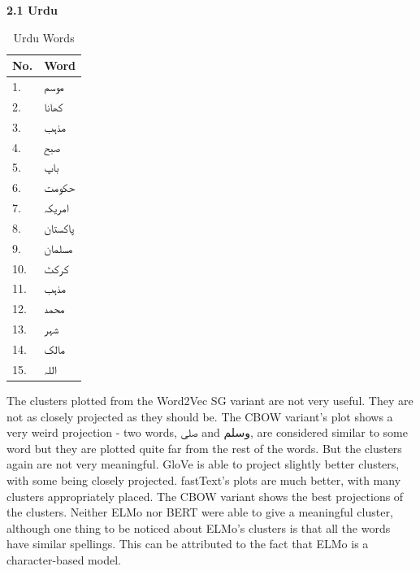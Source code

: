 \documentclass[format=acmsmall,review=true,screen=true]{acmart}
\begin{document}
\textbf{2.1 Urdu}\\

        \begin{table}[]
    \begin{tabular}{|l|l|}
        \hline
                            \textbf{No.} & \textbf{Word}    \\
    \hline
    1.            &      \texturdu{موسم}\\
       \hline
    \hline
    2.           &      \texturdu{کھانا}\\
       \hline
    \hline
    3.             &      \texturdu{مذہب}\\
       \hline
    \hline
    4.             &      \texturdu{صبح}\\
       \hline
        \hline
    5.             &      \texturdu{باپ}\\
       \hline
    \hline
    6.             &      \texturdu{حکومت}\\
       \hline
    \hline
    7.             &      \texturdu{امریکہ}\\
       \hline
    \hline
    8.             &      \texturdu{پاکستان}\\
       \hline
    \hline
    9.             &      \texturdu{مسلمان}\\
       \hline
    \hline
    10.             &      \texturdu{کرکٹ}\\
       \hline
    \hline
    11.             &      \texturdu{مذہب}\\
       \hline
    \hline
    12.             &      \texturdu{محمد}\\
       \hline      
    \hline
    13.             &      \texturdu{شہر}\\
       \hline     
    \hline
    14.             &      \texturdu{مالک}\\
       \hline     
    \hline
    15.             &      \texturdu{اللہ}\\
       \hline             
    \end{tabular}
        \caption{\label{tab:table-name}Urdu Words}
    \end{table}


The clusters plotted from the Word2Vec SG variant are not very useful. They are not as closely projected as they should be. The CBOW variant’s plot shows a very weird projection - two words, صلی and وسلم, are considered similar to some word but they are plotted quite far from the rest of the words. But the clusters again are not very meaningful. GloVe is able to project slightly better clusters, with some being closely projected. fastText’s plots are much better, with many clusters appropriately placed. The CBOW variant shows the best projections of the clusters. Neither ELMo nor BERT were able to give a meaningful cluster, although one thing to be noticed about ELMo’s clusters is that all the words have similar spellings. This can be attributed to the fact that ELMo is a character-based model.\\
\end{document}
